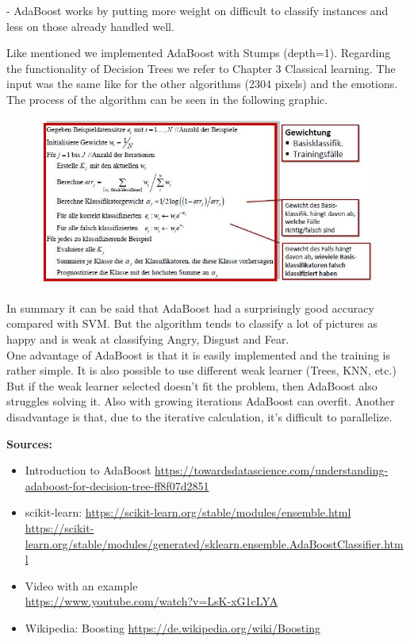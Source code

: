 - AdaBoost works by putting more weight on difficult to classify instances and less on those already handled well.

Like mentioned we implemented AdaBoost with Stumps (depth=1). Regarding the functionality of Decision Trees we refer to Chapter 3 Classical learning. The input was the same like for the other algorithms (2304 pixels) and the emotions. The process of the algorithm can be seen in the following graphic. 
\begin{figure}[hbtp]
	\centering
\includegraphics[scale=0.8]{Images/Adaboost_1.png} \\
\end{figure}

In summary it can be said that AdaBoost had a surprisingly good accuracy compared with SVM. But the algorithm tends to classify a lot of pictures as happy and is weak at classifying Angry, Disgust and Fear.\\
One advantage of AdaBoost is that it is easily implemented and the training is rather simple. It is also possible to use different weak learner (Trees, KNN, etc.) But if the weak learner selected doesn't fit the problem, then AdaBoost also struggles solving it. Also with growing iterations AdaBoost can overfit. Another disadvantage is that, due to the iterative calculation, it's difficult to parallelize.

\textbf{Sources:}
\begin{itemize}
\item Introduction to AdaBoost \hyperlink{https://towardsdatascience.com/understanding-adaboost-for-decision-tree-ff8f07d2851}{https://towardsdatascience.com/understanding-adaboost-for-decision-tree-ff8f07d2851}
\item scikit-learn: \hyperlink{https://scikit-learn.org/stable/modules/ensemble.html}{https://scikit-learn.org/stable/modules/ensemble.html} \\
\hyperlink{https://scikit-learn.org/stable/modules/generated/sklearn.ensemble.AdaBoostClassifier.html}{https://scikit-learn.org/stable/modules/generated/sklearn.ensemble.AdaBoostClassifier.html}
\item Video with an example \\ \hyperlink{https://www.youtube.com/watch?v=LsK-xG1cLYA}{https://www.youtube.com/watch?v=LsK-xG1cLYA}
\item Wikipedia: Boosting \hyperlink{https://de.wikipedia.org/wiki/Boosting}{https://de.wikipedia.org/wiki/Boosting}
\end{itemize}



\newpage